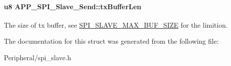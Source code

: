 \paragraph[{\texorpdfstring{tx\+Buffer\+Len}{txBufferLen}}]{\setlength{\rightskip}{0pt plus 5cm}u8 A\+P\+P\+\_\+\+S\+P\+I\+\_\+\+Slave\+\_\+\+Send\+::tx\+Buffer\+Len}\hypertarget{struct_a_p_p___s_p_i___slave___send_aa5815761e8a3218cf21c493003b7555a}{}\label{struct_a_p_p___s_p_i___slave___send_aa5815761e8a3218cf21c493003b7555a}
The size of tx buffer, see \hyperlink{group___s_p_i___s_l_a_v_e___m_a_x___b_u_f___s_i_z_e}{S\+P\+I\+\_\+\+S\+L\+A\+V\+E\+\_\+\+M\+A\+X\+\_\+\+B\+U\+F\+\_\+\+S\+I\+ZE} for the limition. 

The documentation for this struct was generated from the following file\+:\begin{DoxyCompactItemize}
\item 
Peripheral/spi\+\_\+slave.\+h\end{DoxyCompactItemize}
